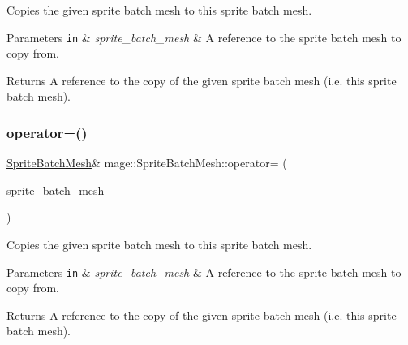 Copies the given sprite batch mesh to this sprite batch mesh.


\begin{DoxyParams}[1]{Parameters}
\mbox{\tt in}  & {\em sprite\+\_\+batch\+\_\+mesh} & A reference to the sprite batch mesh to copy from. \\
\hline
\end{DoxyParams}
\begin{DoxyReturn}{Returns}
A reference to the copy of the given sprite batch mesh (i.\+e. this sprite batch mesh). 
\end{DoxyReturn}
\hypertarget{classmage_1_1_sprite_batch_mesh_a678700348ef43c46ed90d87d78c498de}{}\label{classmage_1_1_sprite_batch_mesh_a678700348ef43c46ed90d87d78c498de} 
\subsubsection{\texorpdfstring{operator=()}{operator=()}\hspace{0.1cm}{\footnotesize\ttfamily [2/2]}}
{\footnotesize\ttfamily \hyperlink{classmage_1_1_sprite_batch_mesh}{Sprite\+Batch\+Mesh}\& mage\+::\+Sprite\+Batch\+Mesh\+::operator= (\begin{DoxyParamCaption}\item[{\hyperlink{classmage_1_1_sprite_batch_mesh}{Sprite\+Batch\+Mesh} \&\&}]{sprite\+\_\+batch\+\_\+mesh }\end{DoxyParamCaption})\hspace{0.3cm}{\ttfamily [delete]}}

Copies the given sprite batch mesh to this sprite batch mesh.


\begin{DoxyParams}[1]{Parameters}
\mbox{\tt in}  & {\em sprite\+\_\+batch\+\_\+mesh} & A reference to the sprite batch mesh to copy from. \\
\hline
\end{DoxyParams}
\begin{DoxyReturn}{Returns}
A reference to the copy of the given sprite batch mesh (i.\+e. this sprite batch mesh). 
\end{DoxyReturn}
\hypertarget{classmage_1_1_sprite_batch_mesh_a11398d9b698b72d56c4c5ea2f81d18ed}{}\label{classmage_1_1_sprite_batch_mesh_a11398d9b698b72d56c4c5ea2f81d18ed} 
